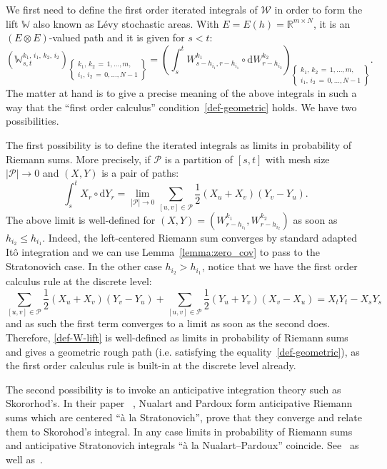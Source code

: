 \documentclass[11pt]{article}
\theoremstyle{definition}
\numberwithin{equation}{section}
\numberwithin{figure}{section}
\numberwithin{table}{section}
\newcommand*\half{\frac{1}{2}}
\newcommand*\R{\mathbb{R}}
\newcommand*\W{\mathbb{W}}
\newcommand*\Pc{\mathcal{P}}
\newcommand*\Wc{\mathcal{W}}
\newcommand*{\dd}{\mathrm{d}}
\newcommand*{\dW}{\dd W}
\newcommand*{\dY}{\dd Y}
\begin{document}
We first need to define the first order iterated integrals of $\Wc$ in order to form the lift $\W$ also known as Lévy stochastic areas. With $E = E(h)=\R^{m \times N}$, it is an $(E \otimes E)$-valued path and it is given for $s<t$:
\begin{equation}\label{def-W-lift}
\left(\W_{s,t}^{k_1,\,i_1,\,k_2,\,i_2}\right)_{\left\{\substack{k_1,\,k_2\,=\,1,\dots, m,\\i_1,\,i_2\,=\,0,\dots,N-1}\right\}}%
= \left(\int_{s}^t W^{k_1}_{s-h_{i_1},r-h_{i_1}}
\circ \dW^{k_2}_{r-h_{i_2}}\right)_{\left\{\substack{k_1,\,k_2\,=\,1,\dots,m,\\ i_1,\,i_2\,=\,0,\dots,N-1}\right\}} .
\end{equation}
The matter at hand is to give a precise meaning of the above integrals in such a way that the ``first order calculus'' condition~\eqref{def-geometric} holds. We have two possibilities.

The first possibility is to define the iterated integrals as limits in probability of Riemann sums. More precisely, if $\Pc$ is a partition of $[s,t]$ with mesh size $|\Pc| \rightarrow 0$ and $(X,Y)$ is a pair of paths:
\[
\int_{s}^t X_r \circ \dY_r
= \lim_{|\Pc| \rightarrow 0}
\sum_{[u,v] \in \Pc}
\half \left(X_u + X_v \right)
\left(Y_v - Y_u \right)
.
\]
The above limit is well-defined for $\left(X, Y \right) = \left(W^{k_1}_{r-h_{i_1}}, W^{k_2}_{r-h_{i_2}}\right)$ as soon as $h_{i_2} \leq h_{i_1}$. Indeed, the left-centered Riemann sum converges by standard adapted Itô integration and we can use Lemma~\ref{lemma:zero_cov} to pass to the Stratonovich case. In the other case $h_{i_2} > h_{i_1}$, notice that we have the first order calculus rule at the discrete level:
\begin{equation}\label{eq-discrete-first-order}
\sum_{[u,v] \in \Pc} \half \left(X_u + X_v \right)\left(Y_v - Y_u \right) + \sum_{[u,v] \in \Pc} \half \left(Y_u + Y_v \right)\left(X_v - X_u \right) = X_t Y_t - X_s Y_s
\end{equation}
and as such the first term converges to a limit as soon as the second does. Therefore, \eqref{def-W-lift} is well-defined as limits in probability of Riemann sums and gives a geometric rough path (i.e. satisfying the equality~\eqref{def-geometric}), as the first order calculus rule is built-in at the discrete level already.

The second possibility is to invoke an anticipative integration theory such as Skororhod's. In their paper~\cite[Section~4]{nualart1988stochastic} , Nualart and Pardoux form anticipative Riemann sums which are centered ``à la Stratonovich'', prove that they converge and relate them to Skorohod's integral. In any case limits in probability of Riemann sums and anticipative Stratonovich integrals ``à la Nualart--Pardoux'' coincide. See~\cite[Exercise~5.17]{FH14} as well as~\cite{ocone1989generalized}.
\end{document}
